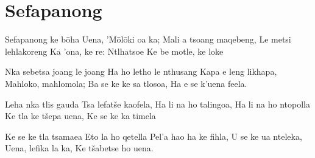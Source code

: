 \starttocol
\chapter{Sefapanong}
\nexttocol
\hfill{\it }
\stoptocol
\starttocol
\startlines
{\sc Sefapanong} ke b\=oha
Uena, 'M\=ol\=oki oa ka;
Mali a tsoang maqebeng,
Le metsi lehlakoreng
Ka 'ona, ke re: Ntlhatsoe
Ke be motle, ke loke

Nka sebetsa joang le joang
Ha ho letho le nthusang
Kapa e leng likhapa,
Mahloko, mahlomola;
Ba se ke ke sa tlosoa,
Ha e se k'uena feela.

Leha nka tlis gauda
Tsa lefat\v se kaofela,
Ha li na ho talingoa,
Ha li na ho ntopolla
Ke tla ke t\v sepa uena, 
Ke se ke ka timela

Ke se ke tla tsamaea
Eto la ho qetella
Pel'a hao ha ke fihla,
U se ke ua nteleka,
Uena, lefika la ka,
Ke t\v sabetse ho uena.
\stoplines
\nexttocol

\stoptocol
